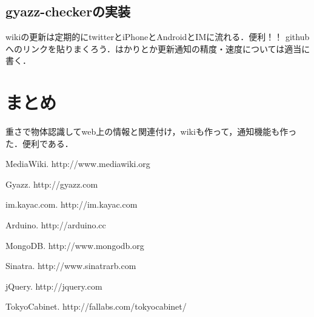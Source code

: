 \subsection{gyazz-checkerの実装}


wikiの更新は定期的にtwitterとiPhoneとAndroidとIMに流れる．便利！！
githubへのリンクを貼りまくろう．はかりとか更新通知の精度・速度については適当に書く．


\section{まとめ}
重さで物体認識してweb上の情報と関連付け，wikiも作って，通知機能も作った．便利である．


\begin{thebibliography}{10}

MediaWiki. http://www.mediawiki.org

Gyazz. http://gyazz.com

im.kayac.com. http://im.kayac.com

Arduino. http://arduino.cc

MongoDB. http://www.mongodb.org

Sinatra. http://www.sinatrarb.com

jQuery. http://jquery.com

TokyoCabinet. http://fallabs.com/tokyocabinet/

\end{thebibliography}

